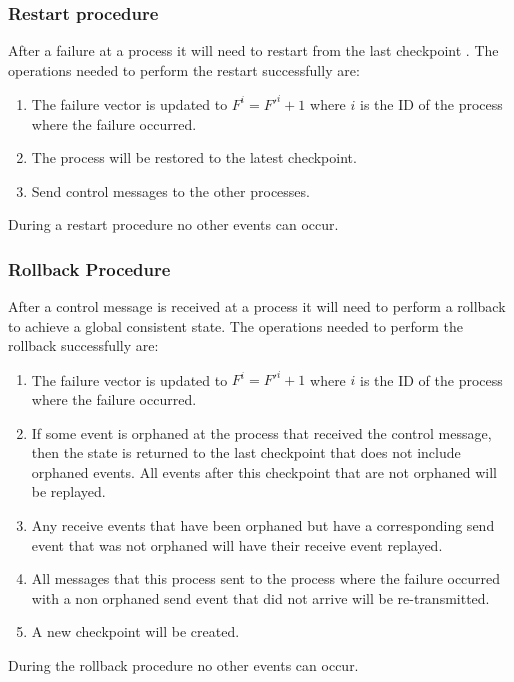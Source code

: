 \documentclass[twocolumn, a4paper,11pt]{article}%
\begin{document}
\subsubsection{Restart procedure}
\par After a failure at a process it will need to restart from the last checkpoint . The operations needed to perform the restart successfully are:
\begin{enumerate}
	\item The failure vector is updated to \(F^{i} = F'^{i} +1\) where \(i\) is the ID of the process where the failure occurred.
	\item The process will be restored to the latest checkpoint.
	\item Send control messages to the other processes.
\end{enumerate}
During a restart procedure no other events can occur.

\subsubsection{Rollback Procedure}
\par After a control message is received at a process it will need to perform a rollback to achieve a global consistent state. The operations needed to perform the rollback successfully are:
\begin{enumerate}
	\item The failure vector is updated to \(F^{i} = F'^{i}  + 1\) where \(i\) is the ID of the process where the failure occurred.
	\item If some event is orphaned at the process that received the control message, then the state is returned to the last checkpoint that does not include orphaned events. All events after this checkpoint that are not orphaned will be replayed.
	\item Any receive events that have been orphaned but have a corresponding send event that was not orphaned will have their receive event replayed.
	\item All messages that this process sent to the process where the failure occurred with a non orphaned send event that did not arrive will be re-transmitted.
	\item A new checkpoint will be created.
\end{enumerate}
During the rollback procedure no other events can occur.
\end{document}
